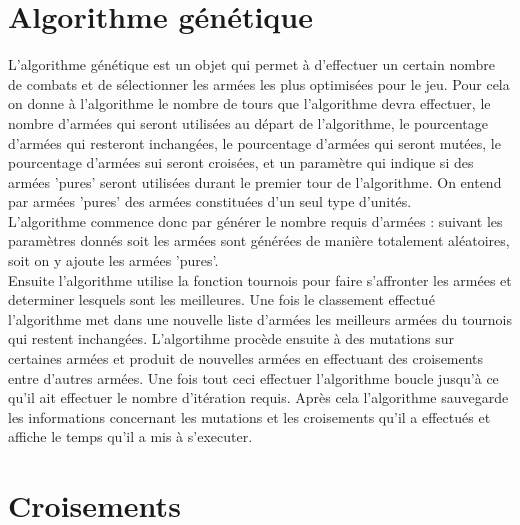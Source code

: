 \documentclass{article}
\begin{document}
\section{Algorithme génétique}
L'algorithme génétique est un objet qui permet à d'effectuer un certain nombre de combats et de sélectionner les armées les plus optimisées pour le jeu. Pour cela on donne à l'algorithme le nombre de tours que l'algorithme devra effectuer, le nombre d'armées qui seront utilisées au départ de l'algorithme, le pourcentage d'armées qui resteront inchangées, le pourcentage d'armées qui seront mutées, le pourcentage d'armées sui seront croisées, et un paramètre qui indique si des armées 'pures' seront utilisées durant le premier tour de l'algorithme. On entend par armées 'pures' des armées constituées d'un seul type d'unités. \\
L'algorithme commence donc par générer le nombre requis d'armées : suivant les paramètres donnés soit les armées sont générées de manière totalement aléatoires, soit on y ajoute les armées 'pures'. \\
Ensuite l'algorithme utilise la fonction tournois pour faire s'affronter les armées et determiner lesquels sont les meilleures. Une fois le classement effectué l'algorithme met dans une nouvelle liste d'armées les meilleurs armées du tournois qui restent inchangées. L'algortihme procède ensuite à des mutations sur certaines armées et produit de nouvelles armées en effectuant des croisements entre d'autres armées. Une fois tout ceci effectuer l'algorithme boucle jusqu'à ce qu'il ait effectuer le nombre d'itération requis. Après cela l'algorithme sauvegarde les informations concernant les mutations et  les croisements qu'il a effectués et affiche le temps qu'il a mis à s'executer.

\section{Croisements}
\end{document}
